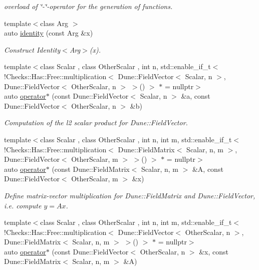 \begin{DoxyCompactItemize}
\begin{DoxyCompactList}\small\item\em overload of \char`\"{}-\/\char`\"{}-\/operator for the generation of functions. \end{DoxyCompactList}\item 
{\footnotesize template$<$class Arg $>$ }\\auto \hyperlink{namespaceFunG_a165e879e76d3a2a8906938f3658445ce}{identity} (const \-Arg \&x)
\begin{DoxyCompactList}\small\item\em \-Construct \-Identity$<$\-Arg$>$(x). \end{DoxyCompactList}\item 
{\footnotesize template$<$class Scalar , class Other\-Scalar , int n, std\-::enable\-\_\-if\-\_\-t$<$ !\-Checks\-::\-Has\-::\-Free\-::multiplication$<$ Dune\-::\-Field\-Vector$<$ Scalar, n $>$, Dune\-::\-Field\-Vector$<$ Other\-Scalar, n $>$ $>$() $>$ $\ast$  = nullptr$>$ }\\auto \hyperlink{namespaceFunG_a5e258023361844926f485229c62a733b}{operator$\ast$} (const \-Dune\-::\-Field\-Vector$<$ \-Scalar, n $>$ \&a, const \-Dune\-::\-Field\-Vector$<$ \-Other\-Scalar, n $>$ \&b)
\begin{DoxyCompactList}\small\item\em \-Computation of the l2 scalar product for \-Dune\-::\-Field\-Vector. \end{DoxyCompactList}\item 
{\footnotesize template$<$class Scalar , class Other\-Scalar , int n, int m, std\-::enable\-\_\-if\-\_\-t$<$ !\-Checks\-::\-Has\-::\-Free\-::multiplication$<$ Dune\-::\-Field\-Matrix$<$ Scalar, n, m $>$, Dune\-::\-Field\-Vector$<$ Other\-Scalar, m $>$ $>$() $>$ $\ast$  = nullptr$>$ }\\auto \hyperlink{namespaceFunG_abadb8da34a5abc3dde0107231ab91c6f}{operator$\ast$} (const \-Dune\-::\-Field\-Matrix$<$ \-Scalar, n, m $>$ \&\-A, const \-Dune\-::\-Field\-Vector$<$ \-Other\-Scalar, m $>$ \&x)
\begin{DoxyCompactList}\small\item\em \-Define matrix-\/vector multiplication for \-Dune\-::\-Field\-Matrix and \-Dune\-::\-Field\-Vector, i.\-e. compute $y=Ax$. \end{DoxyCompactList}\item 
{\footnotesize template$<$class Scalar , class Other\-Scalar , int n, int m, std\-::enable\-\_\-if\-\_\-t$<$ !\-Checks\-::\-Has\-::\-Free\-::multiplication$<$ Dune\-::\-Field\-Vector$<$ Other\-Scalar, n $>$, Dune\-::\-Field\-Matrix$<$ Scalar, n, m $>$ $>$() $>$ $\ast$  = nullptr$>$ }\\auto \hyperlink{namespaceFunG_a19a9d7b55b56f5101560034413a1dbfe}{operator$\ast$} (const \-Dune\-::\-Field\-Vector$<$ \-Other\-Scalar, n $>$ \&x, const \-Dune\-::\-Field\-Matrix$<$ \-Scalar, n, m $>$ \&\-A)

\end{DoxyCompactItemize}
